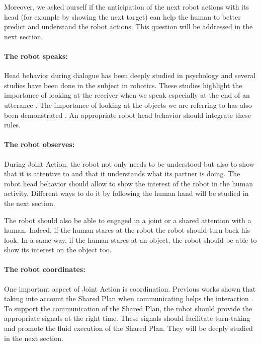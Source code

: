 \documentclass[english,a4paper,11pt,twoside]{StyleThese}
\begin{document}
Moreover, we asked ourself if the anticipation of the next robot actions with its head (for example by showing the next target) can help the human to better predict and understand the robot actions.
This question will be addressed in the next section.

\paragraph{The robot speaks:}

Head behavior during dialogue has been deeply studied in psychology and several studies have been done in the subject in robotics. These studies highlight the importance of looking at the receiver when we speak especially at the end of an utterance \cite{boucher2010facilitative, skantze2014turn}. The importance of looking at the objects we are referring to has also been demonstrated \cite{mutlu2009footing, staudte2011investigating}. An appropriate robot head behavior should integrate these rules.

\paragraph{The robot observes:}
During Joint Action, the robot not only needs to be understood but also to show that it is attentive to and that it understands what its partner is doing. The robot head behavior should allow to show the interest of the robot in the human activity. Different ways to do it by following the human hand will be studied in the next section. 

The robot should also be able to engaged in a joint or a shared attention with a human. Indeed, if the human stares at the robot the robot should turn back his look. In a same way, if the human stares at an object, the robot should be able to show its interest on the object too.

\paragraph{The robot coordinates:}

One important aspect of Joint Action is coordination. Previous works shown that taking into account the Shared Plan when communicating helps the interaction \cite{lallee2013cooperative}. To support the communication of the Shared Plan, the robot should provide the appropriate signals at the right time. These signals should facilitate turn-taking and promote the fluid execution of the Shared Plan. They will be deeply studied in the next section.
\end{document}
